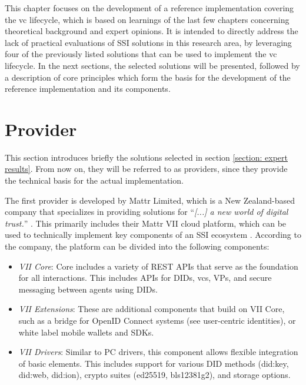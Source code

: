 This chapter focuses on the development of a reference implementation covering the \ac{vc} lifecycle, which is based on learnings of the last few chapters concerning theoretical background and expert opinions. It is intended to directly address the lack of practical evaluations of \ac{SSI} solutions in this research area, by leveraging four of the previously listed solutions that can be used to implement the \ac{vc} lifecycle. In the next sections, the selected solutions will be presented, followed by a description of core principles which form the basis for the development of the reference implementation and its components.

    \section{Provider}
    
    This section introduces briefly the solutions selected in section \ref{section: expert results}. From now on, they will be referred to as providers, since they provide the technical basis for the actual implementation.
    
    The first provider is developed by Mattr Limited, which is a New Zealand-based company \cite{Mattr_privacy_2021} that specializes in providing solutions for “\textit{[...] a new world of digital trust.}” \cite{Mattr_Mattr_2021-4}. This primarily includes their Mattr VII cloud platform, which can be used to technically implement key components of an \ac{SSI} ecosystem \cite{Mattr_products_2021}. According to the company, the platform can be divided into the following components: \cite{Mattr_Mattr_2021-2}

    \begin{itemize}
        \item \textit{VII Core}: Core includes a variety of REST APIs that serve as the foundation for all interactions. This includes APIs for \acp{DID}, \acp{vc}, \acp{VP}, and secure messaging between agents using \acp{DID}. \cite{Mattr_vii_2021}
        \item \textit{VII Extensions}: These are additional components that build on VII Core, such as a bridge for OpenID Connect systems (see user-centric identities), or white label mobile wallets and SDKs. \cite{Mattr_vii_2021-1}
        \item \textit{VII Drivers}: Similar to PC drivers, this component allows flexible integration of basic elements. This includes support for various DID methods (did:key, did:web, did:ion), crypto suites (ed25519, bls12381g2)\cite{Mattr_vii_2021-2}, and storage options. \cite{Mattr_vii_2021-3}
    \end{itemize}
    
